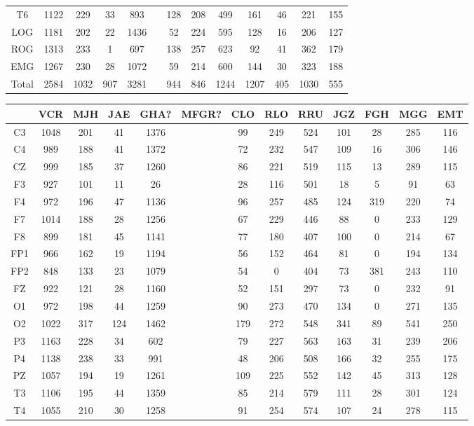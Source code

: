 \begin{SidewaysFigure}
\begin{tabular}{c|ccccc|cccc|ccc}
T6 &1122&229&33&893&&128&208&499&161&46&221&155 \\
LOG &1181&202&22&1436&&52&224&595&128&16&206&127 \\
ROG &1313&233&1&697&&138&257&623&92&41&362&179 \\
EMG &1267&230&28&1072&&59&214&600&144&30&323&188 \\
\hline
Total&2584&1032&907&3281&&944&846&1244&1207&405&1030&555
\end{tabular}
\caption{Total de \'epocas PE clasificadas como sue\~no MOR 
(fase R) para cada
canal. %
}
\label{total_gpos_mor}
\end{SidewaysFigure}

\begin{SidewaysFigure}
\centering
\begin{tabular}{c|ccccc|cccc|ccc}
& VCR & MJH & JAE & GHA? & MFGR? 
& CLO & RLO & RRU & JGZ
& FGH & MGG & EMT \\
\hline
C3 &1048&201&41&1376&&99&249&524&101&28&285&116 \\
C4 &989&188&41&1372&&72&232&547&109&16&306&146 \\
CZ &999&185&37&1260&&86&221&519&115&13&289&115 \\
F3 &927&101&11&26&&28&116&501&18&5&91&63 \\
F4 &972&196&47&1136&&96&257&485&124&319&220&74 \\
F7 &1014&188&28&1256&&67&229&446&88&0&233&129 \\
F8 &899&181&45&1141&&77&180&407&100&0&214&67 \\
FP1 &966&162&19&1194&&56&152&464&81&0&194&134 \\
FP2 &848&133&23&1079&&54&0&404&73&381&243&110 \\
FZ &922&121&28&1160&&52&151&297&73&0&232&91 \\
O1 &972&198&44&1259&&90&273&470&134&0&271&135 \\
O2 &1022&317&124&1462&&179&272&548&341&89&541&250 \\
P3 &1163&228&34&602&&79&227&563&163&31&239&206 \\
P4 &1138&238&33&991&&48&206&508&166&32&255&175 \\
PZ &1057&194&19&1261&&109&225&552&142&45&313&128 \\
T3 &1106&195&44&1359&&85&214&579&111&28&301&124 \\
T4 &1055&210&30&1258&&91&254&574&107&24&278&115 \\

\end{tabular}
\end{SidewaysFigure}
